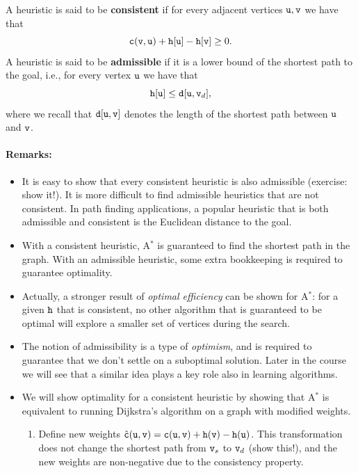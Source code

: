 \begin{definition}
A heuristic is said to be \textbf{consistent} if for every adjacent vertices ${\tt u},{\tt v}$ we have that $${\tt c}({\tt v},{\tt u})+{\tt h}[{\tt u}]-{\tt h}[{\tt v}] \geq 0.$$
A heuristic is said to be \textbf{admissible} if it is a lower bound of the shortest path to the goal, i.e., for every vertex ${\tt u}$ we have that $${\tt h}[{\tt u}] \leq {\tt d}[{\tt u},{\tt v}_d],$$
where we recall that ${\tt d}[{\tt u},{\tt v}]$ denotes the length of the shortest path between ${\tt u}$ and ${\tt v}$.
\end{definition}

\paragraph{Remarks:}
\begin{itemize}
  \item It is easy to show that every consistent heuristic is also admissible (exercise: show it!). It is more difficult to find admissible heuristics that are not consistent. In path finding applications, a popular heuristic that is both admissible and consistent is the Euclidean distance to the goal.
  \item With a consistent heuristic, A$^*$ is guaranteed to find the shortest path in the graph. With an admissible heuristic, some extra bookkeeping is required to guarantee optimality. 
  \item Actually, a stronger result of \textit{optimal efficiency} can be shown for A$^*$: for a given ${\tt h}$ that is consistent, no other algorithm that is guaranteed to be optimal will explore a smaller set of vertices during the search.
  \item The notion of admissibility is a type of \emph{optimism}, and is required to guarantee that we don't settle on a suboptimal solution. Later in the course we will see that a similar idea plays a key role also in learning algorithms. 
  \item We will show optimality for a consistent heuristic by showing that A$^*$ is equivalent to running Dijkstra's algorithm on a graph with modified weights.
  \begin{enumerate}
      \item Define new weights $\hat{{\tt c}}({\tt u},{\tt v}) = {\tt c}({\tt u},{\tt v}) + {\tt h}({\tt v}) - {\tt h}({\tt u})$. This transformation does not change the shortest path from ${\tt v}_s$ to ${\tt v}_d$ (show this!), and the new weights are non-negative due to the consistency property.

\end{enumerate}
\end{itemize}
